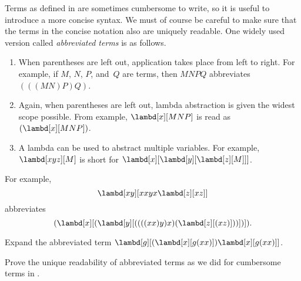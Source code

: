 \documentclass[../../../include/open-logic-section]{subfiles}
\begin{document}

Terms as defined in  are sometimes cumbersome to
write, so it is useful to introduce a more concise syntax. We must of
course be careful to make sure that the terms in the concise notation
also are uniquely readable.  One widely used version called
\emph{abbreviated terms} is as follows.

\begin{enumerate}
\item When parentheses are left out, application takes place from left
  to right. For example, if $M$, $N$, $P$, and~$Q$ are terms, then
  $MNPQ$ abbreviates $(((MN)P)Q)$.
\item Again, when parentheses are left out, lambda abstraction is
  given the widest scope possible. From example, $\lambd[x][MNP]$ is
  read as $(\lambd[x][MNP])$.
\item A lambda can be used to abstract multiple variables. For
  example, $\lambd[xyz][M]$ is short for
  $\lambd[x][\lambd[y][\lambd[z][M]]]$.
\end{enumerate}

For example,
\[
\lambd[xy][xxyx \lambd[z][xz]]
\]
abbreviates
\[
(\lambd[x][(\lambd[y][((((xx)y)x)(\lambd[z][(xz)]))])]).
\]

\begin{prob}
Expand the abbreviated term $\lambd[g][(\lambd[x][g (x x)])
  \lambd[x][g (x x)]]$.
\end{prob}

\begin{prob}
  Prove the unique readability of abbreviated terms as we did for
  cumbersome terms in .
\end{prob}
\end{document}
